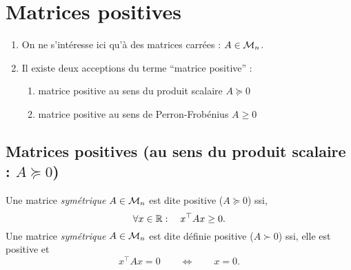 \section{Matrices positives} \label{sec:LinAlg-Pos}

\remarks 
\begin{enumerate}
  \item On ne s'intéresse ici qu'à des matrices carrées : $A \in \mathcal{M}_n$.
  \item Il existe deux acceptions du terme ``matrice positive'' :
  \begin{enumerate}[$\bullet$]
    \item matrice positive au sens du produit scalaire $A \succcurlyeq 0$
    \item matrice positive au sens de Perron-Frobénius $A \geq 0$
  \end{enumerate}
\end{enumerate}


\subsection{Matrices positives (au sens du produit scalaire : $A \succcurlyeq 0$)} 

\begin{definition} \label{def:matricePositive}
  Une matrice {\em symétrique} $A \in \mathcal{M}_n$ est dite positive ($A \succcurlyeq 0$) ssi, 
  $$
  \forall x \in \mathbb{R}: \quad x^\top A x \geq 0.
  $$
  Une matrice {\em symétrique} $A \in \mathcal{M}_n$ est dite définie positive ($A \succ 0$) ssi, elle est positive et 
  $$
  x^\top A x = 0 \qquad \Leftrightarrow \qquad x = 0.
  $$
\end{definition}

